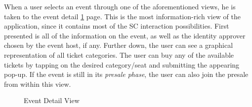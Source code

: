 When a user selects an event through one of the aforementioned views, he is taken to the event detail \ref{img:event-details} page. This is the most information-rich view of the application, since it contains most of the SC interaction possibilities. First presented is all of the information on the event, as well as the identity approver chosen by the event host, if any. Further down, the user can see a graphical representation of all ticket categories. The user can buy any of the available tickets by tapping on the desired category/seat and submitting the appearing pop-up. If the event is still in its \textit{presale phase}, the user can also join the presale from within this view. 
\begin{figure}[!tbp]
  \centering
  \hfill
    \hfill

  \caption{Event Detail View}
  \label{img:event-details}
\end{figure}
